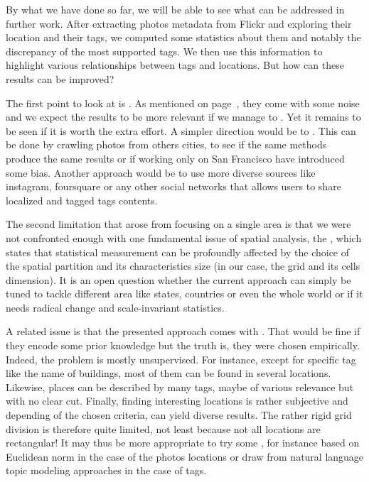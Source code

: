 By  what we have done so far, we will be able to see
what  can be addressed in further work. After
extracting photos metadata from Flickr and exploring their location and their
tags, we computed some statistics about them and notably the discrepancy of
the most supported tags. We then use this information to highlight various
relationships between tags and locations. But how can these results can be
improved?

\medskip

The first point to look at is . As mentioned on
page~\pageref{p:data}, they come with some noise and we expect the results to
be more relevant if we manage to . Yet it remains to be
seen if it is worth the extra effort. A simpler direction would be to
. This can be done by crawling photos from
others cities, to see if the same methods produce the same results or if
working only on San Francisco have introduced some bias. Another approach
would be to use more diverse sources like instagram, foursquare or any other
social networks that allows users to share localized and tagged tags contents.


The second limitation that arose from focusing on a single area is that we
were not confronted enough with one fundamental issue of spatial analysis, the
\cite{scale}, which states that
statistical measurement can be profoundly affected by the choice of the
spatial partition and its characteristics size (in our case, the grid and its
cells dimension).  It is an open question whether the current approach can
simply be tuned to tackle different area like states, countries or even the
whole world or if it needs radical change and scale-invariant statistics.

A related issue is that the presented approach comes with . That would be fine if they encode some prior
knowledge but the truth is, they were chosen empirically. Indeed, the problem
is mostly unsupervised. For instance, except for specific tag like the name of
buildings, most of them can be found in several locations. Likewise, places
can be described by many tags, maybe of various relevance but with no clear
cut. Finally, finding interesting locations is rather subjective and depending
of the chosen criteria, can yield diverse results. The rather rigid grid
division is therefore quite limited, not least because not all locations are
rectangular! It may thus be more appropriate to try some
, for instance based on Euclidean
norm in the case of the photos locations or draw from natural language topic
modeling approaches in the case of tags\cite{topicModel}.


